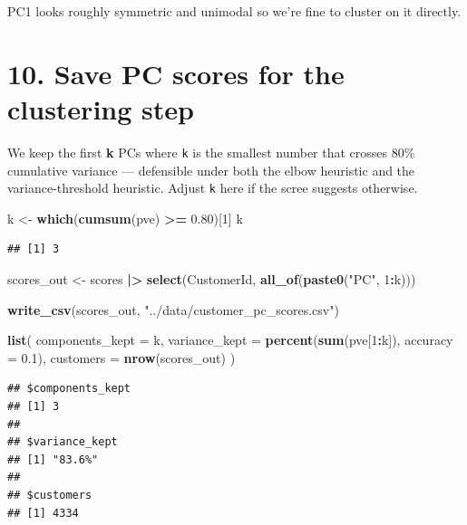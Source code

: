\documentclass[
]{article}
\newenvironment{Shaded}{\begin{snugshade}}{\end{snugshade}}
\newcommand{\AttributeTok}[1]{\textcolor[rgb]{0.13,0.29,0.53}{#1}}
\newcommand{\DecValTok}[1]{\textcolor[rgb]{0.00,0.00,0.81}{#1}}
\newcommand{\FloatTok}[1]{\textcolor[rgb]{0.00,0.00,0.81}{#1}}
\newcommand{\FunctionTok}[1]{\textcolor[rgb]{0.13,0.29,0.53}{\textbf{#1}}}
\newcommand{\NormalTok}[1]{#1}
\newcommand{\OtherTok}[1]{\textcolor[rgb]{0.56,0.35,0.01}{#1}}
\newcommand{\SpecialCharTok}[1]{\textcolor[rgb]{0.81,0.36,0.00}{\textbf{#1}}}
\newcommand{\StringTok}[1]{\textcolor[rgb]{0.31,0.60,0.02}{#1}}
\begin{document}
PC1 looks roughly symmetric and unimodal so we're fine to cluster on it
directly.

\section{10. Save PC scores for the clustering
step}\label{save-pc-scores-for-the-clustering-step}

We keep the first \textbf{k} PCs where \texttt{k} is the smallest number
that crosses 80\% cumulative variance --- defensible under both the
elbow heuristic and the variance-threshold heuristic. Adjust \texttt{k}
here if the scree suggests otherwise.

\begin{Shaded}
\begin{Highlighting}[]
\NormalTok{k }\OtherTok{\textless{}{-}} \FunctionTok{which}\NormalTok{(}\FunctionTok{cumsum}\NormalTok{(pve) }\SpecialCharTok{\textgreater{}=} \FloatTok{0.80}\NormalTok{)[}\DecValTok{1}\NormalTok{]}
\NormalTok{k}
\end{Highlighting}
\end{Shaded}

\begin{verbatim}
## [1] 3
\end{verbatim}

\begin{Shaded}
\begin{Highlighting}[]
\NormalTok{scores\_out }\OtherTok{\textless{}{-}}\NormalTok{ scores }\SpecialCharTok{|\textgreater{}}
  \FunctionTok{select}\NormalTok{(CustomerId, }\FunctionTok{all\_of}\NormalTok{(}\FunctionTok{paste0}\NormalTok{(}\StringTok{"PC"}\NormalTok{, }\DecValTok{1}\SpecialCharTok{:}\NormalTok{k)))}

\FunctionTok{write\_csv}\NormalTok{(scores\_out, }\StringTok{"../data/customer\_pc\_scores.csv"}\NormalTok{)}

\FunctionTok{list}\NormalTok{(}
  \AttributeTok{components\_kept =}\NormalTok{ k,}
  \AttributeTok{variance\_kept   =} \FunctionTok{percent}\NormalTok{(}\FunctionTok{sum}\NormalTok{(pve[}\DecValTok{1}\SpecialCharTok{:}\NormalTok{k]), }\AttributeTok{accuracy =} \FloatTok{0.1}\NormalTok{),}
  \AttributeTok{customers       =} \FunctionTok{nrow}\NormalTok{(scores\_out)}
\NormalTok{)}
\end{Highlighting}
\end{Shaded}

\begin{verbatim}
## $components_kept
## [1] 3
## 
## $variance_kept
## [1] "83.6%"
## 
## $customers
## [1] 4334
\end{verbatim}
\end{document}
